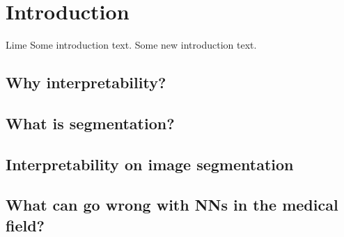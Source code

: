\chapter{Introduction}
Lime \cite{ribeiro2016should}
Some introduction text.
Some new introduction text.

\section{Why interpretability?}
\section{What is segmentation?}
\section{Interpretability on image segmentation}
\section{What can go wrong with NNs in the medical field?}
